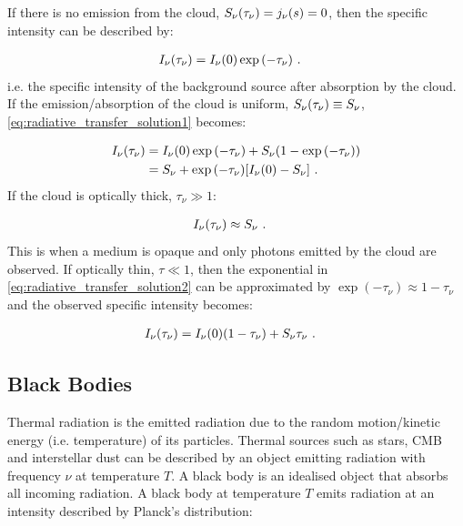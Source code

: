 If there is no emission from the cloud, $S_\nu\qty(\tau_\nu)=j_\nu\qty(s)=0$, then the specific intensity can be described by:

\begin{equation}
    \begin{aligned}
        I_\nu\qty(\tau_\nu)&=I_\nu\qty(0)\exp\qty(-\tau_\nu)\text{ .}
    \end{aligned}
\end{equation}
\noindent i.e. the specific intensity of the background source after absorption by the cloud. If the emission/absorption of the cloud is uniform, $S_\nu\qty(\tau_\nu)\equiv S_\nu$, \autoref{eq:radiative_transfer_solution1} becomes:

\begin{equation}
	\begin{aligned}
		I_\nu\qty(\tau_\nu)&=I_\nu\qty(0)\exp\qty(-\tau_\nu)+S_\nu\qty(1-\exp\qty(-\tau_\nu)) \\
        &=S_\nu + \exp\qty(-\tau_\nu)\qty[I_\nu\qty(0)-S_\nu] \text{ .}
	\end{aligned} \label{eq:radiative_transfer_solution2}
\end{equation}
\noindent If the cloud is optically thick, $\tau_\nu\gg 1$:

\begin{equation}
    \begin{aligned}
        I_\nu\qty(\tau_\nu)&\approx S_\nu\text{ .}
    \end{aligned}
\end{equation}
\noindent This is when a medium is opaque and only photons emitted by the cloud are observed. If optically thin, $\tau \ll 1$, then the exponential in \autoref{eq:radiative_transfer_solution2} can be approximated by $\exp(-\tau_\nu)\approx 1-\tau_\nu$ and the observed specific intensity becomes:

\begin{equation}
	\begin{aligned}
		I_\nu\qty(\tau_\nu)&=I_\nu\qty(0)\qty(1-\tau_\nu)+S_\nu\tau_\nu\text{ .}
	\end{aligned}
\end{equation}

\subsection{Black Bodies} \label{sec:06_blackbodies}

Thermal radiation is the emitted radiation due to the random motion/kinetic energy (i.e. temperature) of its particles. Thermal sources such as stars, CMB and interstellar dust can be described by an object emitting radiation with frequency $\nu$ at temperature $T$. A black body is an idealised object that absorbs all incoming radiation. A black body at temperature $T$ emits radiation at an intensity described by Planck's distribution:

